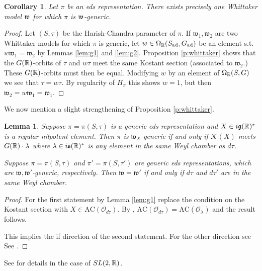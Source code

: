 \documentclass{article}
\newtheorem{lem}[thm]{Lemma}
\newtheorem{cor}[thm]{Corollary}
\theoremstyle{definition}
\numberwithin{equation}{section}
\renewcommand{\-}{\hyp{}}
\newcommand{\s}{\mathfrak s}
\newcommand{\g}{\mathfrak g}
\renewcommand{\O}{\mathcal O}
\newcommand{\K}{\mathcal K}
\newcommand{\w}{\mathfrak w}
\newcommand{\AC}{\mathrm{AC}}
\begin{document}
\begin{cor}
	Let $\pi$ be an eds representation. There exists precisely one Whittaker model $\mathfrak{w}$ for which $\pi$ is $\mathfrak{w}$-generic.
\end{cor}
\begin{proof}
	Let $(S,\tau)$ be the Harish-Chandra parameter of $\pi$.
 If $\w_1,\w_2$ are two Whittaker models for which $\pi$ is generic, let $w \in \Omega_{\mathbb{R}}(S_{\textrm{ad}},G_{\textrm{ad}})$ be an element s.t. $w\w_1=\w_2$ by Lemmas \ref{lem:g1} and \ref{lem:g2}. Proposition \ref{p:whittaker} shows that the $G(\mathbb{R})$-orbits of $\tau$ and $w\tau$ meet the same Kostant section (associated to $\w_2$.) These $G(\mathbb{R})$-orbits must then be equal. Modifying $w$ by an element of $\Omega_{\mathbb{R}}(S,G)$ we see that $\tau=w\tau$. By regularity of $H_\pi$ this shows $w=1$, but then $\w_2=w\w_1=\w_1$.
\end{proof}

We now mention  a slight strengthening of Proposition \ref{p:whittaker}. 

\begin{lem} \label{lem:g2'}
Suppose $\pi=\pi(S,\tau)$ is a generic eds representation and $X\in i\g(\R)^*$ is a regular nilpotent element.
Then $\pi$ is $\w_X$-generic if and only if
$\K(X)$ meets $G(\mathbb{R})\cdot\lambda$ where $\lambda\in i\s(\R)^*$ is any element in the same Weyl chamber as $d\tau$.

Suppose $\pi=\pi(S,\tau)$ and $\pi'=\pi(S,\tau')$ are generic eds representations, which are $\w, \w'$-generic, respectively.
Then $\w=\w'$ if and only if $d\tau$ and $d\tau'$ are in the same Weyl chamber. 
\end{lem}

\begin{proof}
For the first statement by Lemma \ref{lem:g1} replace the condition on the Kostant section with $X\in \AC(\O_{d\tau})$.
By \cite[Proposition 3.9]{adams_afgoustidis_whittaker}, $\AC(\O_{d\tau})=\AC(\O_\lambda)$ and the result follows.

  This implies the if direction of the second statement. For the other direction see
  See \cite[Lemma 3.13]{adams_afgoustidis_whittaker}.
\end{proof}

See \cite{adams_afgoustidis_whittaker} for details  in the case of $SL(2,\mathbb{R})$.
\end{document}
